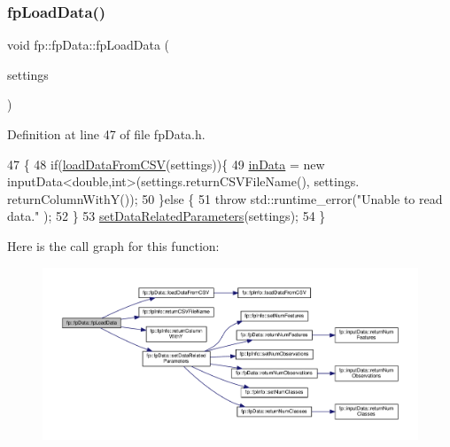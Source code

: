 \subsubsection{\texorpdfstring{fp\+Load\+Data()}{fpLoadData()}}
{\footnotesize\ttfamily void fp\+::fp\+Data\+::fp\+Load\+Data (\begin{DoxyParamCaption}\item[{\hyperlink{classfp_1_1fpInfo}{fp\+Info} \&}]{settings }\end{DoxyParamCaption})\hspace{0.3cm}{\ttfamily [inline]}}



Definition at line 47 of file fp\+Data.\+h.


\begin{DoxyCode}
47                                              \{
48                 \textcolor{keywordflow}{if}(\hyperlink{classfp_1_1fpData_a2b4d9be328aaa7acf9a2561150da0402}{loadDataFromCSV}(settings))\{
49                     \hyperlink{classfp_1_1fpData_a49d7c3f58bcf88843c25b1b0c9714ebe}{inData} = \textcolor{keyword}{new} inputData<double,int>(settings.returnCSVFileName(), settings.
      returnColumnWithY());
50                 \}\textcolor{keywordflow}{else} \{
51                     \textcolor{keywordflow}{throw} std::runtime\_error(\textcolor{stringliteral}{"Unable to read data."} );
52                 \}
53                 \hyperlink{classfp_1_1fpData_ab48923d57206e17b88f0d89833051b43}{setDataRelatedParameters}(settings);
54             \}
\end{DoxyCode}
Here is the call graph for this function\+:
\nopagebreak
\begin{figure}[H]
\begin{center}
\leavevmode
\includegraphics[width=350pt]{classfp_1_1fpData_a91c727b1475eca340ca14c241b25c959_cgraph}
\end{center}
\end{figure}
\mbox{\label{classfp_1_1fpData_a4b527bc84762c4708992b7fdce3d0602}} 
